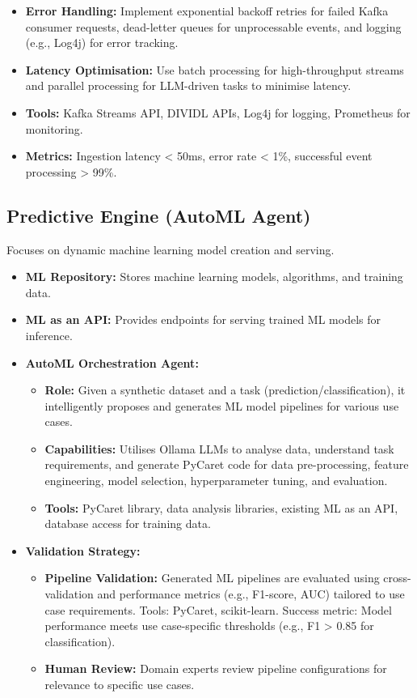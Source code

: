 \documentclass{article}
\begin{document}
\begin{itemize}
\begin{itemize}
            \item \textbf{Error Handling:} Implement exponential backoff retries for failed Kafka consumer requests, dead-letter queues for unprocessable events, and logging (e.g., Log4j) for error tracking.
            \item \textbf{Latency Optimisation:} Use batch processing for high-throughput streams and parallel processing for LLM-driven tasks to minimise latency.
            \item \textbf{Tools:} Kafka Streams API, DIVIDL APIs, Log4j for logging, Prometheus for monitoring.
            \item \textbf{Metrics:} Ingestion latency < 50ms, error rate < 1\%, successful event processing > 99\%.
        \end{itemize}
\end{itemize}

\subsection{Predictive Engine (AutoML Agent)}
Focuses on dynamic machine learning model creation and serving.
\begin{itemize}
    \item \textbf{ML Repository:} Stores machine learning models, algorithms, and training data.
    \item \textbf{ML as an API:} Provides endpoints for serving trained ML models for inference.
    \item \textbf{AutoML Orchestration Agent:}
        \begin{itemize}
            \item \textbf{Role:} Given a synthetic dataset and a task (prediction/classification), it intelligently proposes and generates ML model pipelines for various use cases.
            \item \textbf{Capabilities:} Utilises Ollama LLMs to analyse data, understand task requirements, and generate PyCaret code for data pre-processing, feature engineering, model selection, hyperparameter tuning, and evaluation.
            \item \textbf{Tools:} PyCaret library, data analysis libraries, existing ML as an API, database access for training data.
        \end{itemize}
    \item \textbf{Validation Strategy:}
        \begin{itemize}
            \item \textbf{Pipeline Validation:} Generated ML pipelines are evaluated using cross-validation and performance metrics (e.g., F1-score, AUC) tailored to use case requirements. Tools: PyCaret, scikit-learn. Success metric: Model performance meets use case-specific thresholds (e.g., F1 > 0.85 for classification).
            \item \textbf{Human Review:} Domain experts review pipeline configurations for relevance to specific use cases.
        \end{itemize}
\end{itemize}
\end{document}
